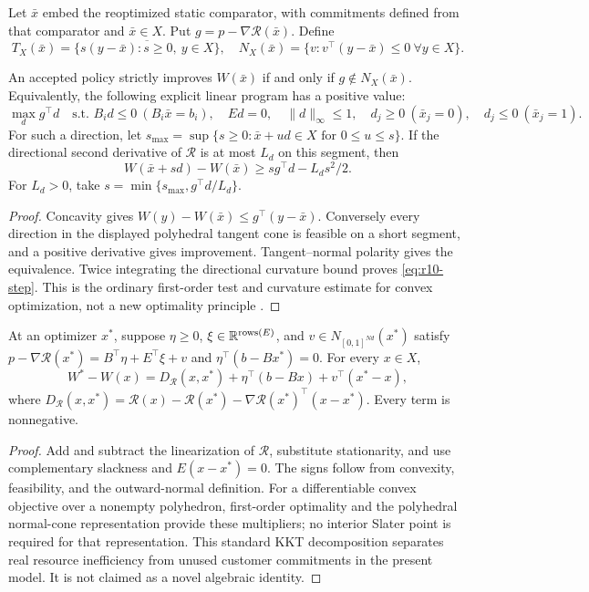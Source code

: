 Let $\bar x$ embed the reoptimized static comparator, with commitments defined from that comparator and $\bar x\in X$. Put $g=p-\nabla\mathcal R(\bar x)$. Define
\[
 T_X(\bar x)=\overline{\{s(y-\bar x):s\geq0,\ y\in X\}},\quad
 N_X(\bar x)=\{v:v^\top(y-\bar x)\leq0\ \forall y\in X\}.
\]
\begin{lemma}\label{lem:r10-alternative}
An accepted policy strictly improves $W(\bar x)$ if and only if $g\notin N_X(\bar x)$. Equivalently, the following explicit linear program has a positive value:
\[
 \max_d g^\top d\quad\text{s.t. } B_i d\leq0\ (B_i\bar x=b_i),\quad Ed=0,\quad
 \|d\|_\infty\leq1,\quad
 d_j\geq0\ (\bar x_j=0),\quad d_j\leq0\ (\bar x_j=1).
\]
For such a direction, let $s_{\max}=\sup\{s\geq0:\bar x+ud\in X\text{ for }0\leq u\leq s\}$. If the directional second derivative of $\mathcal R$ is at most $L_d$ on this segment, then
\begin{equation}\label{eq:r10-step}
 W(\bar x+sd)-W(\bar x)\geq s g^\top d-L_ds^2/2.
\end{equation}
For $L_d>0$, take $s=\min\{s_{\max},g^\top d/L_d\}$.
\end{lemma}
\begin{proof}
Concavity gives $W(y)-W(\bar x)\leq g^\top(y-\bar x)$. Conversely every direction in the displayed polyhedral tangent cone is feasible on a short segment, and a positive derivative gives improvement. Tangent--normal polarity gives the equivalence. Twice integrating the directional curvature bound proves \eqref{eq:r10-step}. This is the ordinary first-order test and curvature estimate for convex optimization, not a new optimality principle \citep{BoydVandenberghe2004}.
\end{proof}

\begin{lemma}\label{lem:r10-bregman}
At an optimizer $x^*$, suppose $\eta\geq0$, $\xi\in\mathbb R^{\mathrm{rows}(E)}$, and $v\in N_{[0,1]^{Nd}}(x^*)$ satisfy
$p-\nabla\mathcal R(x^*)=B^\top\eta+E^\top\xi+v$ and $\eta^\top(b-Bx^*)=0$. For every $x\in X$,
\[
 W^*-W(x)=D_{\mathcal R}(x,x^*)+\eta^\top(b-Bx)+v^\top(x^*-x),
\]
where $D_{\mathcal R}(x,x^*)=\mathcal R(x)-\mathcal R(x^*)-\nabla\mathcal R(x^*)^\top(x-x^*)$. Every term is nonnegative.
\end{lemma}
\begin{proof}
Add and subtract the linearization of $\mathcal R$, substitute stationarity, and use complementary slackness and $E(x-x^*)=0$. The signs follow from convexity, feasibility, and the outward-normal definition. For a differentiable convex objective over a nonempty polyhedron, first-order optimality and the polyhedral normal-cone representation provide these multipliers; no interior Slater point is required for that representation. This standard KKT decomposition \citep{BoydVandenberghe2004} separates real resource inefficiency from unused customer commitments in the present model. It is not claimed as a novel algebraic identity.
\end{proof}
